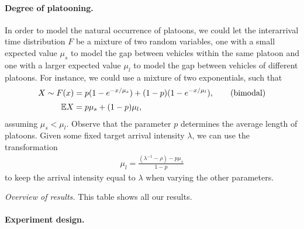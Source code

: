 \documentclass[a4paper]{report}
\theoremstyle{definition}
\theoremstyle{plain}
\begin{document}
\paragraph{Degree of platooning.}
In order to model the natural occurrence of platoons, we could let the interarrival
time distribution $F$ be a mixture of two random variables, one with a small expected
value $\mu_s$ to model the gap between vehicles within the same platoon and one
with a larger expected value $\mu_{l}$ to model the gap between vehicles of
different platoons. For instance, we could use a mixture of two exponentials, such
that
\begin{align}\label{eq:mixture}
  X \sim F(x) &= p ( 1 - e^{-x / \mu_{s}} ) + (1 - p) (1 - e^{-x / \mu_{l}}) , \tag{bimodal} \\[0.2em]
  \mathbb{E}{X} &= p \mu_{s} + (1-p) \mu_{l} , \notag
\end{align}
%
assuming $\mu_{s} < \mu_{l}$. Observe that the parameter $p$ determines the
average length of platoons.
%
Given some fixed target arrival intensity $\lambda$, we can use the transformation
\begin{align*}
  \mu_{l}  = \frac{(\lambda^{-1} - \rho) - p \mu_{s}}{1 - p}
\end{align*}
to keep the arrival intensity equal to $\lambda$ when varying the other
parameters.

\begin{table}
  \caption{\emph{Overview of results.} This table shows all our results.}
\begin{adjustbox}{center}
\scalebox{0.8}{

}
\end{adjustbox}
\end{table}

\paragraph{Experiment design.}
\end{document}
